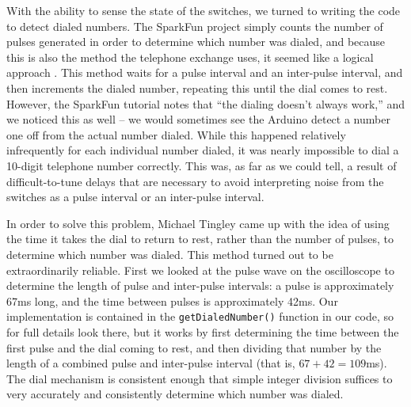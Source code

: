 \documentclass{es50report}
\begin{document}
    With the ability to sense the state of the switches, we turned to writing the code to detect dialed numbers. The SparkFun project simply counts the number of pulses generated in order to determine which number was dialed, and because this is also the method the telephone exchange uses, it seemed like a logical approach \cite{seidle05}. This method waits for a pulse interval and an inter-pulse interval, and then increments the dialed number, repeating this until the dial comes to rest. However, the SparkFun tutorial notes that ``the dialing doesn't always work,'' and we noticed this as well -- we would sometimes see the Arduino detect a number one off from the actual number dialed. While this happened relatively infrequently for each individual number dialed, it was nearly impossible to dial a 10-digit telephone number correctly. This was, as far as we could tell, a result of difficult-to-tune delays that are necessary to avoid interpreting noise from the switches as a pulse interval or an inter-pulse interval.

    In order to solve this problem, Michael Tingley came up with the idea of using the time it takes the dial to return to rest, rather than the number of pulses, to determine which number was dialed. This method turned out to be extraordinarily reliable. First we looked at the pulse wave on the oscilloscope to determine the length of pulse and inter-pulse intervals: a pulse is approximately 67ms long, and the time between pulses is approximately 42ms. Our implementation is contained in the \verb+getDialedNumber()+ function in our code, so for full details look there, but it works by first determining the time between the first pulse and the dial coming to rest, and then dividing that number by the length of a combined pulse and inter-pulse interval (that is, $67 + 42 = 109$ms). The dial mechanism is consistent enough that simple integer division suffices to very accurately and consistently determine which number was dialed.
\end{document}
